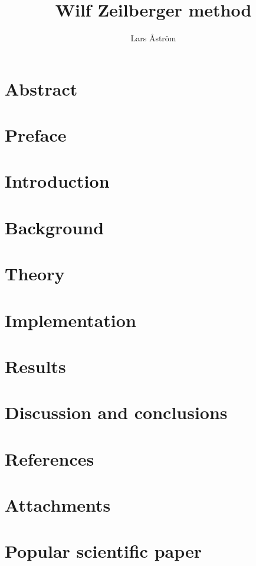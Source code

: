 \documentclass{LTHthesis}
\theoremstyle{definition}
\begin{document}
\begin{titlepages}
\author{Lars Åström}
\title{Wilf Zeilberger method}
\end{titlepages}
\chapter*{Abstract}

\chapter*{Preface}

\tableofcontents

\chapter{Introduction}\label{Ch: Introduction}


\chapter{Background}\label{Ch: Background}


\chapter{Theory}\label{Ch: Theory}


\chapter{Implementation}\label{Ch: Implementation}


\chapter{Results}\label{Ch: Results}


\chapter{Discussion and conclusions}\label{Ch: Discussion and conclusions}


%
\chapter*{References}


\chapter*{Attachments}


\chapter*{Popular scientific paper}

\end{document}
